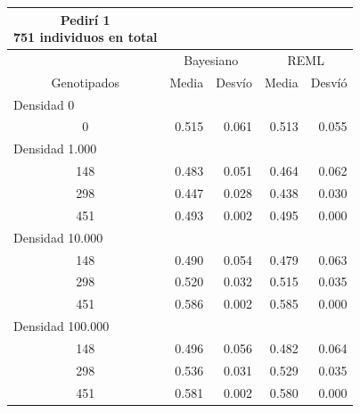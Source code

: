 \documentclass[11pt,spanish,a4paper,oneside,]{book} %
\begin{document}
\captionsetup[table]{labelformat=empty,skip=1pt}
\begin{longtable}{crrrr}
\caption*{
{\large Pedirí 1} \\ 
{\small 751 individuos en total}
} \\ 
\toprule
 & \multicolumn{2}{c}{Bayesiano} & \multicolumn{2}{c}{REML} \\ 
 \cmidrule(lr){2-3} \cmidrule(lr){4-5}
Genotipados & Media & Desvío & Media & Desvíó \\ 
\midrule
\multicolumn{1}{l}{Densidad 0} \\ 
\midrule
0 & 0.515 & 0.061 & 0.513 & 0.055 \\ 
\midrule
\multicolumn{1}{l}{Densidad 1.000} \\ 
\midrule
148 & 0.483 & 0.051 & 0.464 & 0.062 \\ 
298 & 0.447 & 0.028 & 0.438 & 0.030 \\ 
451 & 0.493 & 0.002 & 0.495 & 0.000 \\ 
\midrule
\multicolumn{1}{l}{Densidad 10.000} \\ 
\midrule
148 & 0.490 & 0.054 & 0.479 & 0.063 \\ 
298 & 0.520 & 0.032 & 0.515 & 0.035 \\ 
451 & 0.586 & 0.002 & 0.585 & 0.000 \\ 
\midrule
\multicolumn{1}{l}{Densidad 100.000} \\ 
\midrule
148 & 0.496 & 0.056 & 0.482 & 0.064 \\ 
298 & 0.536 & 0.031 & 0.529 & 0.035 \\ 
451 & 0.581 & 0.002 & 0.580 & 0.000 \\ 
 \bottomrule
\end{longtable}
\captionsetup[table]{labelformat=empty,skip=1pt}
\end{document}
